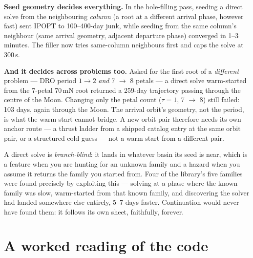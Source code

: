 \documentclass[11pt]{article}
\begin{document}
\begin{meas}
\textbf{Seed geometry decides everything.} In the hole-filling pass, seeding
a direct solve from the neighbouring \emph{column} (a root at a different
arrival phase, however fast) sent IPOPT to 100--400-day junk, while seeding
from the same column's neighbour (same arrival geometry, adjacent departure
phase) converged in 1--3 minutes. The filler now tries same-column
neighbours first and caps the solve at 300\,s.

\textbf{And it decides across problems too.} Asked for the first root of a
\emph{different} problem --- DRO period $1\to2$ \emph{and} 7 $\to$ 8 petals
--- a direct solve warm-started from the 7-petal 70\,mN root returned a
259-day trajectory passing through the centre of the Moon. Changing only the
petal count ($\tau=1$, 7 $\to$ 8) still failed: 103 days, again through the
Moon. The arrival orbit's geometry, not the period, is what the warm start
cannot bridge. A new orbit pair therefore needs its own anchor route --- a
thrust ladder from a shipped catalog entry at the same orbit pair, or a
structured cold guess --- not a warm start from a different pair.
\end{meas}

\begin{warn}
A direct solve is \emph{branch-blind}: it lands in whatever basin its seed is
near, which is a feature when you are hunting for an unknown family and a
hazard when you assume it returns the family you started from. Four of the
library's five families were found precisely by exploiting this --- solving
at a phase where the known family was slow, warm-started from that known
family, and discovering the solver had landed somewhere else entirely, 5--7
days faster. Continuation would never have found them: it follows its own
sheet, faithfully, forever.
\end{warn}

\section{A worked reading of the code}
\end{document}

